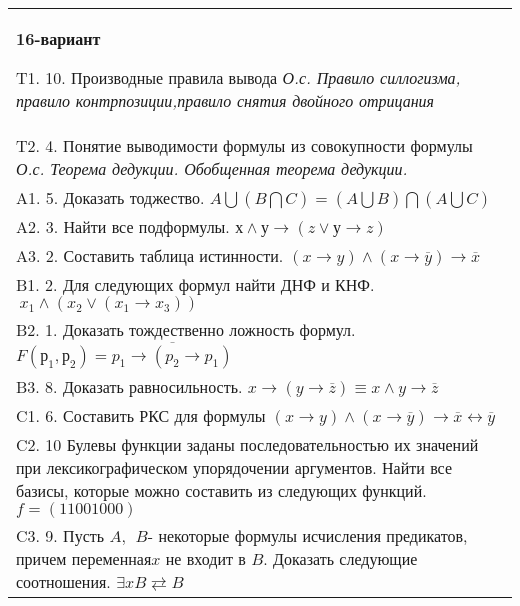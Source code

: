 \documentclass{article}
\begin{document}
\begin{tabular}{m{17cm}}
\textbf{16-вариант}
\newline

T1. 10. Производные правила вывода \emph{О.с. Правило силлогизма, правило контрпозиции,правило снятия двойного отрицания} \\
T2. 4. Понятие выводимости формулы из совокупности формулы \emph{О.с. Теорема дедукции. Обобщенная теорема дедукции.} \\
A1. 5. Доказать тоджество. \(A\bigcup(B\bigcap C) = (A\bigcup B)\bigcap(A\bigcup C)\) \\
A2. 3. Найти все подформулы. \(х \land у \rightarrow (z \vee у \rightarrow z)\) \\
A3. 2. Составить таблица истинности. \((x \rightarrow y) \land (x \rightarrow \overline{y}) \rightarrow \overline{x}\) \\
B1. 2. Для следующих формул найти ДНФ и КНФ. \(\ x_{1} \land (x_{2} \vee (x_{1} \rightarrow x_{3}))\) \\
B2. 1. Доказать тождественно ложность формул. \(F\left( р_{1},р_{2} \right) = \overline{p_{1} \rightarrow (p_{2} \rightarrow p_{1})}\) \\
B3. 8. Доказать равносильность. \(x \rightarrow \left( y \rightarrow \overline{z} \right) \equiv x \land y \rightarrow \overline{z}\) \\
C1. 6. Составить РКС для формулы \((x \rightarrow y) \land (x \rightarrow \overline{y}) \rightarrow \overline{x} \leftrightarrow \overline{y}\) \\
C2. 10 Булевы функции заданы последовательностью их значений при лексикографическом упорядочении аргументов. Найти все базисы, которые можно составить из следующих функций. \(f = (11001000)\) \\
C3. 9. Пусть \(A,\ \ B\)- некоторые формулы исчисления предикатов, причем переменная\(x\) не входит в \(B\). Доказать следующие соотношения. \(\exists xB \rightleftarrows B\)
 \\

\end{tabular}
\vspace{1cm}
\end{document}
